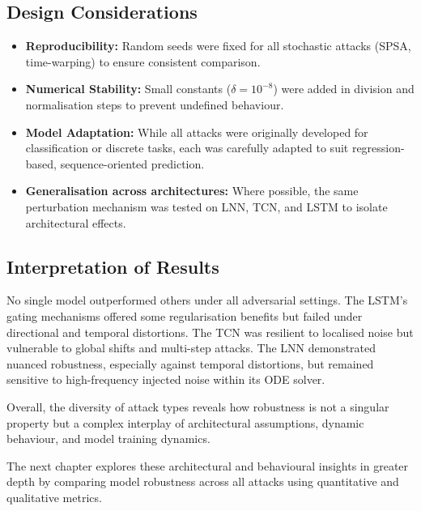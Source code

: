\subsection{Design Considerations}
\begin{itemize}
    \item \textbf{Reproducibility:} Random seeds were fixed for all stochastic attacks (SPSA, time-warping) to ensure consistent comparison.
    \item \textbf{Numerical Stability:} Small constants ($\delta = 10^{-8}$) were added in division and normalisation steps to prevent undefined behaviour.
    \item \textbf{Model Adaptation:} While all attacks were originally developed for classification or discrete tasks, each was carefully adapted to suit regression-based, sequence-oriented prediction.
    \item \textbf{Generalisation across architectures:} Where possible, the same perturbation mechanism was tested on LNN, TCN, and LSTM to isolate architectural effects.
\end{itemize}

\subsection{Interpretation of Results}
No single model outperformed others under all adversarial settings. The LSTM's gating mechanisms offered some regularisation benefits but failed under directional and temporal distortions. The TCN was resilient to localised noise but vulnerable to global shifts and multi-step attacks. The LNN demonstrated nuanced robustness, especially against temporal distortions, but remained sensitive to high-frequency injected noise within its ODE solver.

Overall, the diversity of attack types reveals how robustness is not a singular property but a complex interplay of architectural assumptions, dynamic behaviour, and model training dynamics.

\vspace{1em}
\noindent The next chapter explores these architectural and behavioural insights in greater depth by comparing model robustness across all attacks using quantitative and qualitative metrics.
